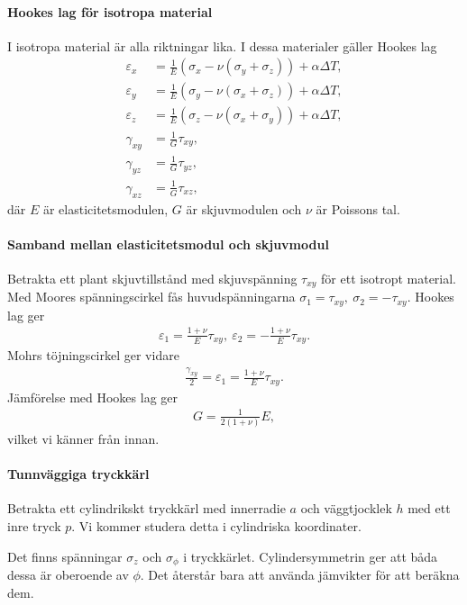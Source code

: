 \paragraph{Hookes lag för isotropa material}
I isotropa material är alla riktningar lika. I dessa materialer gäller Hookes lag
\begin{align*}
	\varepsilon_{x} &= \frac{1}{E}(\sigma_{x} - \nu(\sigma_{y} + \sigma_{z})) + \alpha\Delta T, \\
	\varepsilon_{y} &= \frac{1}{E}(\sigma_{y} - \nu(\sigma_{x} + \sigma_{z})) + \alpha\Delta T, \\
	\varepsilon_{z} &= \frac{1}{E}(\sigma_{z} - \nu(\sigma_{x} + \sigma_{y})) + \alpha\Delta T, \\
	\gamma_{xy}     &= \frac{1}{G}\tau_{xy}, \\
	\gamma_{yz}     &= \frac{1}{G}\tau_{yz}, \\
	\gamma_{xz}     &= \frac{1}{G}\tau_{xz},
\end{align*}
där $E$ är elasticitetsmodulen, $G$ är skjuvmodulen och $\nu$ är Poissons tal.

\paragraph{Samband mellan elasticitetsmodul och skjuvmodul}
Betrakta ett plant skjuvtillstånd med skjuvspänning $\tau_{xy}$ för ett isotropt material. Med Moores spänningscirkel fås huvudspänningarna $\sigma_{1} = \tau_{xy},\ \sigma_{2} = -\tau_{xy}$. Hookes lag ger
\begin{align*}
	\varepsilon_{1} = \frac{1 + \nu}{E}\tau_{xy},\ \varepsilon_{2} = -\frac{1 + \nu}{E}\tau_{xy}.
\end{align*}
Mohrs töjningscirkel ger vidare
\begin{align*}
	\frac{\gamma_{xy}}{2} = \varepsilon_{1} = \frac{1 + \nu}{E}\tau_{xy}.
\end{align*}
Jämförelse med Hookes lag ger
\begin{align*}
	G = \frac{1}{2(1 + \nu)}E,
\end{align*}
vilket vi känner från innan.

\paragraph{Tunnväggiga tryckkärl}
Betrakta ett cylindrikskt tryckkärl med innerradie $a$ och väggtjocklek $h$ med ett inre tryck $p$. Vi kommer studera detta i cylindriska koordinater.

Det finns spänningar $\sigma_{z}$ och $\sigma_{\phi}$ i tryckkärlet. Cylindersymmetrin ger att båda dessa är oberoende av $\phi$. Det återstår bara att använda jämvikter för att beräkna dem.

